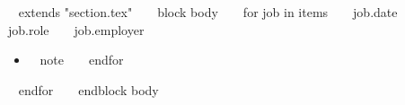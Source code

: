 ~{ extends "section.tex" }~
~{ block body }~
  ~{ for job in items }~
    \jobheading
      {~{{ job.date }}~}
      {~{{ job.role }}~}
      {~{{ job.employer }}~}
    \begin{itemize}
      ~{ for note in job.notes }~
        \item{~{{ note }}~}
      ~{ endfor }~
    \end{itemize}
    \vspace{10pt}
  ~{ endfor }~
  \vspace{-10pt}
~{ endblock body }~
